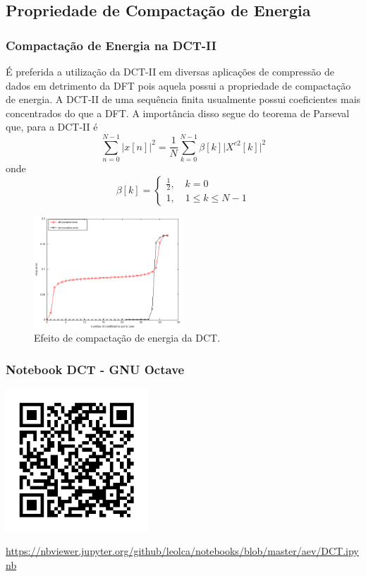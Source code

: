 \subsection{Propriedade de Compactação de Energia}
\begin{frame}[allowframebreaks]
  \frametitle{Compactação de Energia na DCT-II}
  É preferida a utilização da DCT-II em diversas aplicações de compressão de dados em detrimento da DFT pois
  aquela possui a propriedade de compactação de energia. A DCT-II de uma sequência finita usualmente possui
  coeficientes mais concentrados do que a DFT. A importância disso segue do teorema de Parseval que, para a DCT-II é
  \begin{equation}
  \sum_{n=0}^{N-1} \vert x[n] \vert^2 = \frac{1}{N} \sum_{k=0}^{N-1} \beta[k] \vert X^{c2}[k] \vert^2
  \end{equation}
  onde
  \begin{equation}
  \beta[k] = \begin{cases} \frac{1}{2} , \quad k=0 \\ 1 , \quad 1 \leq k \leq N-1 \end{cases}
  \end{equation}

    \begin{figure}[ht]
    \centering
    \includegraphics[width=0.5\textwidth]{images/compact_energy.png}
    \caption{Efeito de compactação de energia da DCT.}
    \label{fig:compact_energy}
    \end{figure}

\end{frame}

\begin{frame}%
  \frametitle{Notebook DCT - GNU Octave}
  \centering
  \includegraphics[width=0.4\textwidth]{images/qrcode-jupyter-dct.pdf}

  \url{https://nbviewer.jupyter.org/github/leolca/notebooks/blob/master/aev/DCT.ipynb}
\end{frame} 

